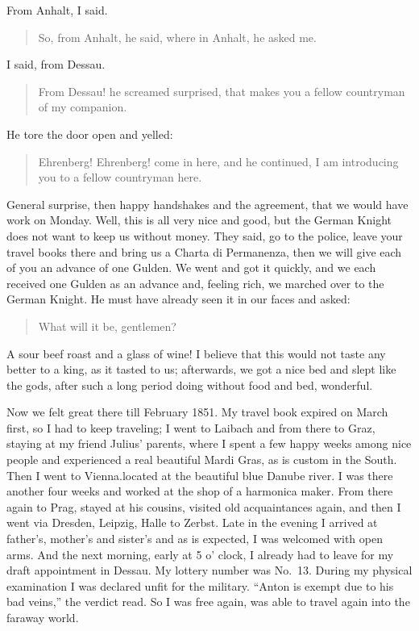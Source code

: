 \documentclass{article}
\begin{document}
From Anhalt, I said.

\begin{quote}
So, from Anhalt, he said, where in Anhalt, he asked me.
\end{quote}

I said, from Dessau.

\begin{quote}
From Dessau! he screamed surprised, that makes you a fellow countryman of my companion.
\end{quote}

He tore the door open and yelled:

\begin{quote}
Ehrenberg! Ehrenberg! come in here, and he continued, I am introducing you to a fellow countryman here.
\end{quote}

General surprise, then happy handshakes and the agreement, that we would have work on Monday. Well, this is all very nice and good, but the German Knight does not want to keep us without money. They said, go to the police, leave your travel books there and bring us a Charta di Permanenza, then we will give each of you an advance of one Gulden. We went and got it quickly, and we each received one Gulden as an advance and, feeling rich, we marched over to the German Knight. He must have already seen it in our faces and asked:

\begin{quote}
What will it be, gentlemen?
\end{quote}

A sour beef roast and a glass of wine! I believe that this would not taste any better to a king, as it tasted to us; afterwards, we got a nice bed and slept like the gods, after such a long period doing without food and bed, wonderful.

Now we felt great there till February 1851. My travel book expired on March first, so I had to keep traveling; I went to Laibach and from there to Graz, staying at my friend Julius' parents, where I spent a few happy weeks among nice people and experienced a real beautiful Mardi Gras, as is custom in the South. Then I went to Vienna.located at the beautiful blue Danube river. I was there another four weeks and worked at the shop of a harmonica maker. From there again to Prag, stayed at his cousins, visited old acquaintances again, and then I went via Dresden, Leipzig, Halle to Zerbst. Late in the evening I arrived at father's, mother's and sister's and as is expected, I was welcomed with open arms. And the next morning, early at 5 o' clock, I already had to leave for my draft appointment in Dessau. My lottery number was No.~13. During my physical examination I was declared unfit for the military. ``Anton is exempt due to his bad veins,'' the verdict read. So I was free again, was able to travel again into the faraway world.
\end{document}
